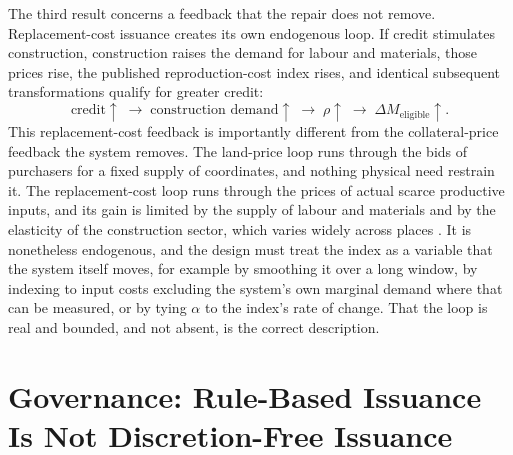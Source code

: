 \documentclass[11pt]{article}
\theoremstyle{definition}
\begin{document}
The third result concerns a feedback that the repair does not remove. Replacement-cost issuance creates its own endogenous loop. If credit stimulates construction, construction raises the demand for labour and materials, those prices rise, the published reproduction-cost index rises, and identical subsequent transformations qualify for greater credit:
\begin{equation}
\text{credit}\uparrow \;\to\; \text{construction demand}\uparrow \;\to\; \rho\uparrow \;\to\; \Delta M_{\mathrm{eligible}}\uparrow .
\label{eq:rhofeed}
\end{equation}
This replacement-cost feedback is importantly different from the collateral-price feedback the system removes. The land-price loop runs through the bids of purchasers for a fixed supply of coordinates, and nothing physical need restrain it. The replacement-cost loop runs through the prices of actual scarce productive inputs, and its gain is limited by the supply of labour and materials and by the elasticity of the construction sector, which varies widely across places \cite{saiz2010}. It is nonetheless endogenous, and the design must treat the index as a variable that the system itself moves, for example by smoothing it over a long window, by indexing to input costs excluding the system's own marginal demand where that can be measured, or by tying $\alpha$ to the index's rate of change. That the loop is real and bounded, and not absent, is the correct description.

\section{Governance: Rule-Based Issuance Is Not Discretion-Free Issuance}
\end{document}
